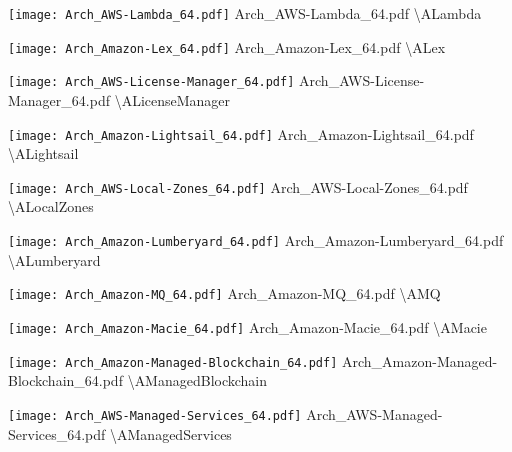  {\texttt{[image: Arch\_AWS-Lambda\_64.pdf]}} {Arch\_AWS-Lambda\_64.pdf} {{\textbackslash}ALambda}

 {\texttt{[image: Arch\_Amazon-Lex\_64.pdf]}} {Arch\_Amazon-Lex\_64.pdf} {{\textbackslash}ALex}

 {\texttt{[image: Arch\_AWS-License-Manager\_64.pdf]}} {Arch\_AWS-License-Manager\_64.pdf} {{\textbackslash}ALicenseManager}

 {\texttt{[image: Arch\_Amazon-Lightsail\_64.pdf]}} {Arch\_Amazon-Lightsail\_64.pdf} {{\textbackslash}ALightsail}

 {\texttt{[image: Arch\_AWS-Local-Zones\_64.pdf]}} {Arch\_AWS-Local-Zones\_64.pdf} {{\textbackslash}ALocalZones}

 {\texttt{[image: Arch\_Amazon-Lumberyard\_64.pdf]}} {Arch\_Amazon-Lumberyard\_64.pdf} {{\textbackslash}ALumberyard}

 {\texttt{[image: Arch\_Amazon-MQ\_64.pdf]}} {Arch\_Amazon-MQ\_64.pdf} {{\textbackslash}AMQ}

 {\texttt{[image: Arch\_Amazon-Macie\_64.pdf]}} {Arch\_Amazon-Macie\_64.pdf} {{\textbackslash}AMacie}

 {\texttt{[image: Arch\_Amazon-Managed-Blockchain\_64.pdf]}} {Arch\_Amazon-Managed-Blockchain\_64.pdf} {{\textbackslash}AManagedBlockchain}

 {\texttt{[image: Arch\_AWS-Managed-Services\_64.pdf]}} {Arch\_AWS-Managed-Services\_64.pdf} {{\textbackslash}AManagedServices}

